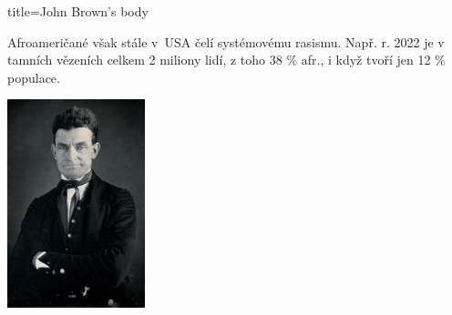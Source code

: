 \begin{song}{title=\predtitle \centering John Brown's body \\\large  }
{\begin{centerjustified}
\begin{varwidth}[t]{0.55\textwidth}
\begin{varwidth}{.5\textwidth}
Afroameričané však stále v~USA čelí systémovému rasismu.
Např. r. 2022 je v tamních vězeních celkem 2 miliony lidí, z toho 38 \% afr., i
když tvoří jen 12 \% populace.
\end{varwidth}
\begin{varwidth}{.2\textwidth}
\includegraphics[width=4cm]{../img/JohnBrown.jpg}
\end{varwidth}



\end{varwidth}
\end{centerjustified}


}




\setcounter{Slokočet}{0}
\end{song}

